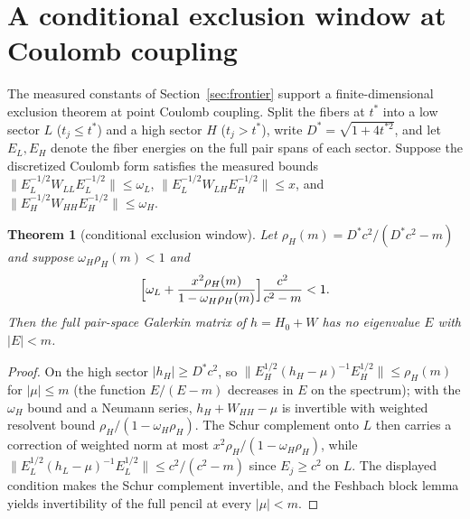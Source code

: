 \documentclass[11pt,reqno]{amsart}
\newtheorem{theorem}{Theorem}[section]
\theoremstyle{definition}
\theoremstyle{remark}
\newcommand{\norm}[1]{\lVert #1\rVert}
\begin{document}
\section{A conditional exclusion window at Coulomb coupling}
\label{sec:t1c}

The measured constants of Section~\ref{sec:frontier} support a
finite-dimensional exclusion theorem at point Coulomb coupling. Split
the fibers at $t^{*}$ into a low sector $L$ ($t_{j}\le t^{*}$) and a
high sector $H$ ($t_{j}>t^{*}$), write $D^{*}=\sqrt{1+4t^{*2}}$, and
let $E_{L},E_{H}$ denote the fiber energies on the full pair spans of
each sector. Suppose the discretized Coulomb form satisfies the
measured bounds
$\norm{E_{L}^{-1/2}W_{LL}E_{L}^{-1/2}}\le\omega_{L}$,
$\norm{E_{L}^{-1/2}W_{LH}E_{H}^{-1/2}}\le x$, and
$\norm{E_{H}^{-1/2}W_{HH}E_{H}^{-1/2}}\le\omega_{H}$.

\begin{theorem}[conditional exclusion window]\label{thm:t1c}
Let $\rho_{H}(m)=D^{*}c^{2}/(D^{*}c^{2}-m)$ and suppose
$\omega_{H}\rho_{H}(m)<1$ and
\[
\Bigl[\omega_{L}
+\frac{x^{2}\rho_{H}(m)}{1-\omega_{H}\rho_{H}(m)}\Bigr]
\frac{c^{2}}{c^{2}-m}<1 .
\]
Then the full pair-space Galerkin matrix of $h=H_{0}+W$ has no
eigenvalue $E$ with $|E|<m$.
\end{theorem}

\begin{proof}
On the high sector $|h_{H}|\ge D^{*}c^{2}$, so
$\norm{E_{H}^{1/2}(h_{H}-\mu)^{-1}E_{H}^{1/2}}\le\rho_{H}(m)$ for
$|\mu|\le m$ (the function $E/(E-m)$ decreases in $E$ on the spectrum);
with the $\omega_{H}$ bound and a Neumann series,
$h_{H}+W_{HH}-\mu$ is invertible with weighted resolvent bound
$\rho_{H}/(1-\omega_{H}\rho_{H})$. The Schur complement onto $L$ then
carries a correction of weighted norm at most
$x^{2}\rho_{H}/(1-\omega_{H}\rho_{H})$, while
$\norm{E_{L}^{1/2}(h_{L}-\mu)^{-1}E_{L}^{1/2}}\le c^{2}/(c^{2}-m)$
since $E_{j}\ge c^{2}$ on $L$. The displayed condition makes the Schur
complement invertible, and the Feshbach block lemma yields
invertibility of the full pencil at every $|\mu|<m$.
\end{proof}
\end{document}
